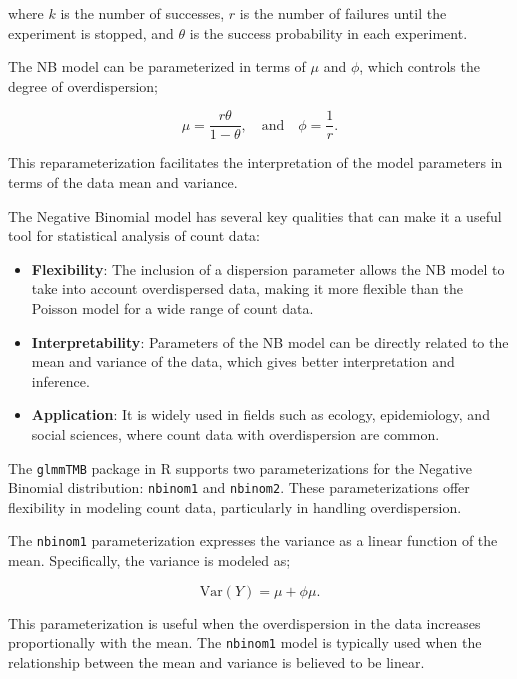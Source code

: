 \documentclass[12pt, twoside,hidelinks]{article}
\theoremstyle{definition}
\numberwithin{equation}{section}
\begin{document}
where $k$ is the number of successes, $r$ is the number of failures until the experiment is stopped, and $\theta$ is the success probability in each experiment.
\newline


The NB model can be parameterized in terms of  $\mu$ and $\phi$, which controls the degree of overdispersion;

\begin{equation}
    \mu = \frac{r\theta}{1-\theta}, \quad \text{and} \quad \phi = \frac{1}{r}.
\end{equation}

This reparameterization facilitates the interpretation of the model parameters in terms of the data mean and variance.
\newline


The Negative Binomial model has several key qualities that can make it a useful tool for statistical analysis of count data:

\begin{itemize}
    \item \textbf{Flexibility}: The inclusion of a dispersion parameter allows the NB model to take into account overdispersed data, making it more flexible than the Poisson model for a wide range of count data.
    \item \textbf{Interpretability}: Parameters of the NB model can be directly related to the mean and variance of the data, which gives better interpretation and inference.
    \item \textbf{Application}: It is widely used in fields such as ecology, epidemiology, and social sciences, where count data with overdispersion are common.
\end{itemize}



The \texttt{glmmTMB} package in R supports two parameterizations for the Negative Binomial distribution: \texttt{nbinom1} and \texttt{nbinom2}. These parameterizations offer flexibility in modeling count data, particularly in handling overdispersion.


The \texttt{nbinom1} parameterization expresses the variance as a linear function of the mean. Specifically, the variance is modeled as;

\begin{equation}
    \text{Var}(Y) = \mu + \phi \mu.
\end{equation}

 This parameterization is useful when the overdispersion in the data increases proportionally with the mean. The \texttt{nbinom1} model is typically used when the relationship between the mean and variance is believed to be linear.
\end{document}
